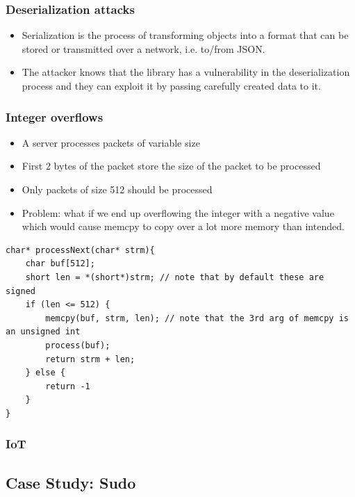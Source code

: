 \documentclass[../notes.tex]{subfiles}
\begin{document}
\subsubsection{Deserialization attacks}

\begin{itemize}
    \item Serialization is the process of transforming objects into a format that can be stored or transmitted over a network, i.e. to/from JSON.
    \item The attacker knows that the library has a vulnerability in the deserialization process and they can exploit it by passing carefully created data to it.
\end{itemize}


\subsubsection{Integer overflows}

\begin{itemize}
    \item A server processes packets of variable size
    \item First 2 bytes of the packet store the size of the packet to be processed
    \item Only packets of size 512 should be processed
    \item Problem: what if we end up overflowing the integer with a negative value which would cause memcpy to copy over a lot more memory than intended.
\end{itemize}

\begin{listing}[H]
\begin{verbatim}
char* processNext(char* strm){
    char buf[512];
    short len = *(short*)strm; // note that by default these are signed
    if (len <= 512) {
        memcpy(buf, strm, len); // note that the 3rd arg of memcpy is an unsigned int
        process(buf);
        return strm + len;
    } else {
        return -1
    }
}
\end{verbatim}
\end{listing}



\subsubsection{IoT}


\subsection{Case Study: Sudo}
\end{document}
